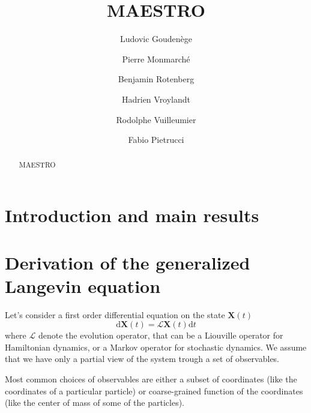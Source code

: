 \documentclass{article}
\title{MAESTRO}
\author{
Ludovic Gouden\`ege\footnotemark[1] \and
Pierre Monmarché\footnotemark[2] \and
Benjamin Rotenberg\footnotemark[3] \and
Hadrien Vroylandt\footnotemark[4] \and
Rodolphe Vuilleumier\footnotemark[5] \and
Fabio Pietrucci\footnotemark[6] }
\date{}
\numberwithin{equation}{section} %
\renewcommand{\thefootnote}{\*}
\newcommand{\vect}[1]{\bm{#1}}
\newcommand{\1}{\mathds{1}} %
\newcommand{\dd}{\mathrm{d}} %
\newcommand{\ddt}{\mathrm{d}t}
\begin{document}
\maketitle
\renewcommand{\thefootnote}{\*}
\renewcommand{\thefootnote}{\fnsymbol{footnote}}



\begin{abstract}
MAESTRO
\end{abstract}

\newpage

\section*{Introduction and main results}


\section{Derivation of the generalized Langevin equation}
Let's consider a first order differential equation on the state $\vect{X}(t)$
\begin{equation}
    \label{eq:operatorEvolution}
    \dd \vect{X} (t) = \mathcal{L} \vect{X}(t) \ddt
\end{equation}
where $\mathcal{L}$ denote the evolution operator, that can be a Liouville operator for Hamiltonian dynamics, or a Markov operator for stochastic dynamics. We assume that we have only a partial view of the system trough a set of observables.

Most common choices of observables are either a subset of coordinates (like the coordinates of a particular particle) or coarse-grained function of the coordinates (like the center of mass of some of the particles).
\end{document}
